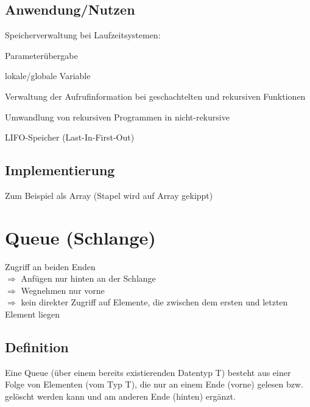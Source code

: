 \subsection{Anwendung/Nutzen}
\begin{compactitem}
	\item Speicherverwaltung bei Laufzeitsystemen:
	\begin{compactitem}
		\item Parameterübergabe
		\item lokale/globale Variable
	\end{compactitem}
	\item Verwaltung der Aufrufinformation bei geschachtelten und rekursiven Funktionen
	\item Umwandlung von rekursiven Programmen in nicht-rekursive
	\item LIFO-Speicher (Last-In-First-Out)
\end{compactitem}

\subsection{Implementierung}
Zum Beispiel als Array (Stapel wird auf Array gekippt)

\section{Queue (Schlange)}
Zugriff {\flqq an beiden Enden\frqq}\\
$\Rightarrow$ Anfügen nur hinten an der Schlange\\
$\Rightarrow$ Wegnehmen nur vorne\\
$\Rightarrow$ kein direkter Zugriff auf Elemente, die zwischen dem ersten und letzten Element liegen

\subsection{Definition}
Eine Queue (über einem bereits existierenden Datentyp T) besteht aus einer Folge von Elementen (vom Typ T), die nur an einem Ende ({\flqq vorne\frqq}) gelesen bzw. gelöscht werden kann und am anderen Ende ({\flqq hinten\frqq}) ergänzt.

